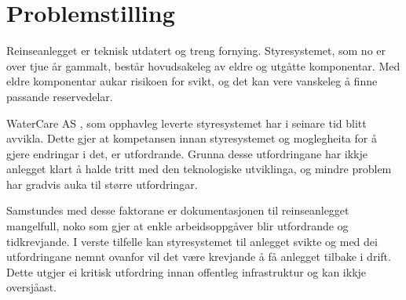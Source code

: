\section{Problemstilling}
Reinseanlegget er teknisk utdatert og treng fornying. Styresystemet, som no er over tjue år gammalt,
består hovudsakeleg av eldre og utgåtte komponentar. Med eldre komponentar aukar risikoen for svikt, 
og det kan vere vanskeleg å finne passande reservedelar.

WaterCare AS \citep{WaterCare}, som opphavleg leverte styresystemet har i seinare tid blitt avvikla. 
Dette gjer at kompetansen innan styresystemet og moglegheita for å gjere endringar i det, er utfordrande.
Grunna desse utfordringane har ikkje anlegget klart å halde tritt med den teknologiske utviklinga, 
og mindre problem har gradvis auka til større utfordringar.

Samstundes med desse faktorane er dokumentasjonen til reinseanlegget mangelfull, noko som gjer at enkle arbeidsoppgåver blir utfordrande og tidkrevjande.
I verste tilfelle kan styresystemet til anlegget svikte og med dei utfordringane nemnt ovanfor vil det være krevjande
å få anlegget tilbake i drift. \newline 
Dette utgjer ei kritisk utfordring innan offentleg infrastruktur og kan ikkje oversjåast.
\newline


